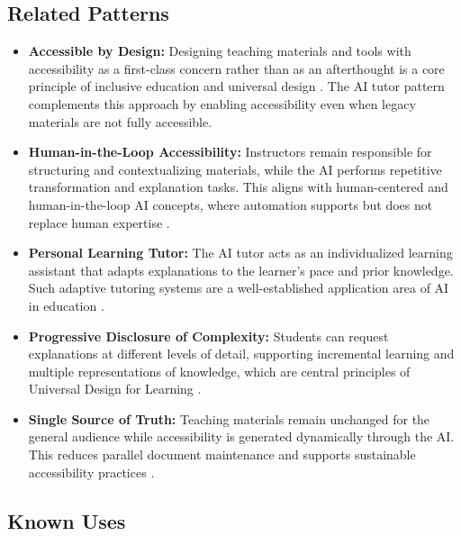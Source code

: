 \subsection*{Related Patterns}

\begin{itemize}
    \item \textbf{Accessible by Design:} Designing teaching materials and tools with accessibility as a first-class concern rather than as an afterthought is a core principle of inclusive education and universal design \cite{w3c2023,burgstahler2015}. The AI tutor pattern complements this approach by enabling accessibility even when legacy materials are not fully accessible.
    \item \textbf{Human-in-the-Loop Accessibility:} Instructors remain responsible for structuring and contextualizing materials, while the AI performs repetitive transformation and explanation tasks. This aligns with human-centered and human-in-the-loop AI concepts, where automation supports but does not replace human expertise \cite{shneiderman2020,ieee2019}.
    \item \textbf{Personal Learning Tutor:} The AI tutor acts as an individualized learning assistant that adapts explanations to the learner’s pace and prior knowledge. Such adaptive tutoring systems are a well-established application area of AI in education \cite{holmes2019}.
    \item \textbf{Progressive Disclosure of Complexity:} Students can request explanations at different levels of detail, supporting incremental learning and multiple representations of knowledge, which are central principles of Universal Design for Learning \cite{burgstahler2015,al-azawei2016}.
    \item \textbf{Single Source of Truth:} Teaching materials remain unchanged for the general audience while accessibility is generated dynamically through the AI. This reduces parallel document maintenance and supports sustainable accessibility practices \cite{lazar2015}.
\end{itemize}

\subsection*{Known Uses}

